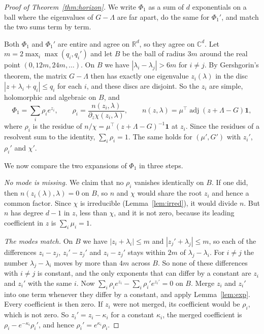 \documentclass[11pt]{article}
\theoremstyle{definition}
\theoremstyle{remark}
\newcommand{\C}{\mathbb C}
\newcommand{\one}{\mathbf 1}
\begin{document}
\begin{proof}[Proof of Theorem~\ref{thm:horizon}]
We write $\Phi_1$ as a sum of $d$ exponentials on a ball where the eigenvalues
of $G-\Lambda$ are far apart, do the same for $\Phi_1'$, and match the two sums
term by term.

Both $\Phi_1$ and $\Phi_1'$ are entire and agree on $\mathbb R^d$, so they agree
on $\C^d$. Let $m=2\max_i\max(q_i,q_i')$ and let $B$ be the ball of radius $3m$
around the real point $(0,12m,24m,\ldots)$. On $B$ we have
$|\lambda_i-\lambda_j|>6m$ for $i\ne j$. By Gershgorin's theorem, the matrix
$G-\Lambda$ then has exactly one eigenvalue $z_i(\lambda)$ in the disc
$|z+\lambda_i+q_i|\le q_i$ for each $i$, and these discs are disjoint. So the
$z_i$ are simple, holomorphic and algebraic on $B$, and
\[
\Phi_1=\sum_i\rho_ie^{z_i},\qquad
\rho_i=\frac{n(z_i,\lambda)}{\partial_z\chi(z_i,\lambda)},\qquad
n(z,\lambda)=\mu^{\top}\operatorname{adj}(z+\Lambda-G)\one,
\]
where $\rho_i$ is the residue of $n/\chi=\mu^{\top}(z+\Lambda-G)^{-1}\one$ at
$z_i$. Since the residues of a resolvent sum to the identity, $\sum_i\rho_i=1$.
The same holds for $(\mu',G')$ with $z_i'$, $\rho_i'$ and $\chi'$.

We now compare the two expansions of $\Phi_1$ in three steps.

\emph{No mode is missing.} We claim that no $\rho_i$ vanishes identically on
$B$. If one did, then $n(z_i(\lambda),\lambda)=0$ on $B$, so $n$ and $\chi$
would share the root $z_i$ and hence a common factor. Since $\chi$ is
irreducible (Lemma~\ref{lem:irred}), it would divide $n$. But $n$ has degree
$d-1$ in $z$, less than $\chi$, and it is not zero, because its leading
coefficient in $z$ is $\sum_i\mu_i=1$.

\emph{The modes match.} On $B$ we have $|z_i+\lambda_i|\le m$ and
$|z_j'+\lambda_j|\le m$, so each of the differences $z_i-z_j$, $z_i'-z_j'$ and
$z_i-z_j'$ stays within $2m$ of $\lambda_j-\lambda_i$. For $i\ne j$ the number
$\lambda_j-\lambda_i$ moves by more than $4m$ across $B$. So none of these
differences with $i\ne j$ is constant, and the only exponents that can differ
by a constant are $z_i$ and $z_i'$ with the same $i$. Now
$\sum_i\rho_ie^{z_i}-\sum_i\rho_i'e^{z_i'}=0$ on $B$. Merge $z_i$ and $z_i'$
into one term whenever they differ by a constant, and apply
Lemma~\ref{lem:exp}. Every coefficient is then zero. If $z_i$ were not merged,
its coefficient would be $\rho_i$, which is not zero. So $z_i'=z_i-\kappa_i$
for a constant $\kappa_i$, the merged coefficient is
$\rho_i-e^{-\kappa_i}\rho_i'$, and hence $\rho_i'=e^{\kappa_i}\rho_i$.


\end{proof}
\end{document}
